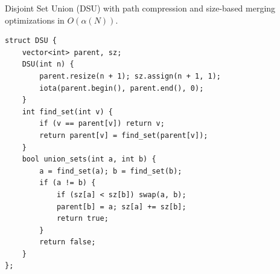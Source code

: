 
Disjoint Set Union (DSU) with path compression and size-based merging optimizations in $O(\alpha(N))$.
\begin{lstlisting}
struct DSU {
    vector<int> parent, sz;
    DSU(int n) {
        parent.resize(n + 1); sz.assign(n + 1, 1);
        iota(parent.begin(), parent.end(), 0);
    }
    int find_set(int v) {
        if (v == parent[v]) return v;
        return parent[v] = find_set(parent[v]);
    }
    bool union_sets(int a, int b) {
        a = find_set(a); b = find_set(b);
        if (a != b) {
            if (sz[a] < sz[b]) swap(a, b);
            parent[b] = a; sz[a] += sz[b];
            return true;
        }
        return false;
    }
};
\end{lstlisting}

